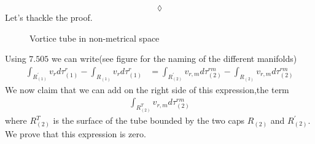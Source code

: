 $$\lozenge$$
Let's thackle the proof.
\begin{figure}[H]%
    \centering
    \subfloat[]{}
\caption{Vortice tube in non-metrical space}
\label{fig:fig_p280a}
\end{figure}
Using $\mathbf{7.505}$ we can write(see figure for the naming of the different manifolds) 
\begin{align}
\int_{R^{'}_{(1)}}v_r d\tau_{(1)}^r - \int_{R^{}_{(1)}}v_r d\tau_{(1)}^r &= \int_{R^{'}_{(2)}}v_{r,m}d\tau_{(2)}^{rm} - \int_{R^{}_{(2)}}v_{r,m}d\tau_{(2)}^{rm}
\end{align}
We now claim that we can add on the right side of this expression,the term 
\begin{align}
 \int_{R^{T}_{(2)}}v_{r,m}d\tau_{(2)}^{rm} 
\end{align}
where $R^{T}_{(2)}$ is the surface of the tube bounded by the two caps $R^{}_{(2)}$ and $R^{'}_{(2)}$. We prove that this expression is zero.\\\\


